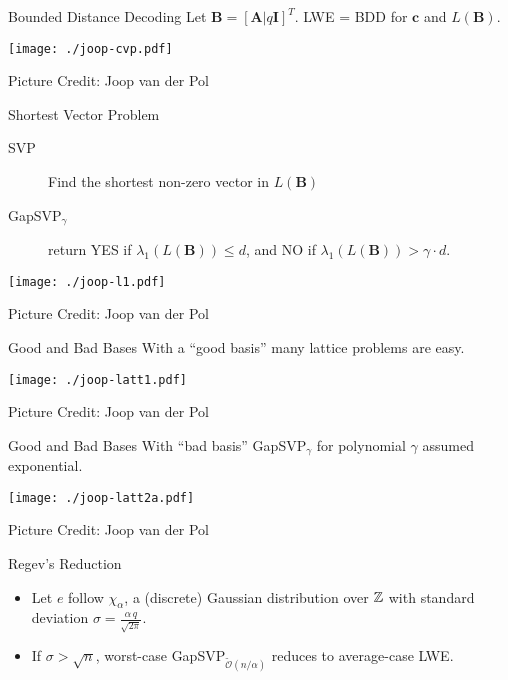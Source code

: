 \documentclass[presentation,smaller]{beamer}
\newcommand{\ZZ}[1][blank]{\ensuremath{\ifthenelse{\equal{#1}{blank}}{\mathbb{Z}}{\mathbb{Z}\left[#1\right]}\xspace}}
\renewcommand{\vec}[1]{\ensuremath{\mathbf{#1}}\xspace}
\begin{document}
\begin{frame}[label={sec:orgheadline10}]{Bounded Distance Decoding}
Let \(\vec{B} = [\vec{A} | q\vec{I}]^T\). LWE = BDD for \(\vec{c}\) and \(L(\vec{B})\).

\texttt{[image: ./joop-cvp.pdf]}

\tiny Picture Credit: Joop van der Pol
\end{frame}


\begin{frame}[label={sec:orgheadline11}]{Shortest Vector Problem}
\begin{description}
\item[{SVP}] Find the shortest non-zero vector in \(L(\vec{B})\)
\item[{GapSVP\(_γ\)}] return YES if \(λ_1(L(\vec{B})) ≤ d\), and NO if \(λ_1(L(\vec{B})) > γ⋅d\).
\end{description}

\begin{center}
\texttt{[image: ./joop-l1.pdf]}
\end{center}

\tiny Picture Credit: Joop van der Pol
\end{frame}

\begin{frame}[label={sec:orgheadline12}]{Good and Bad Bases}
With a “good basis” many lattice problems are easy.

\begin{center}
\texttt{[image: ./joop-latt1.pdf]}
\end{center}

\tiny Picture Credit: Joop van der Pol
\end{frame}


\begin{frame}[label={sec:orgheadline13}]{Good and Bad Bases}
With “bad basis” GapSVP\(_γ\) for polynomial \(γ\) assumed exponential.

\begin{center}
\texttt{[image: ./joop-latt2a.pdf]}
\end{center}

\tiny Picture Credit: Joop van der Pol
\end{frame}


\begin{frame}[label={sec:orgheadline14}]{Regev’s Reduction}
\begin{theorem}
\begin{itemize}
\item Let \(e\) follow \(χ_α\), a (discrete) Gaussian distribution over \(\ZZ\) with standard deviation \(σ = \frac{α\, q}{\sqrt{2π}}\).
\item If \(σ >  \sqrt{n}\), worst-case GapSVP\(_{\tilde{\mathcal{O}}(n/α)}\) reduces to average-case LWE.
\end{itemize}
\end{theorem}

\end{frame}
\end{document}
